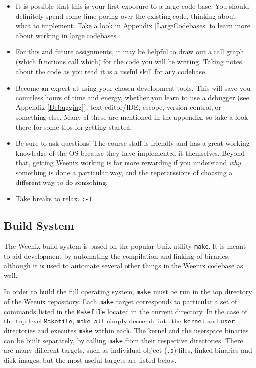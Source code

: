 \begin{itemize}
    \item It is possible that this is your first exposure to a large code base. You should definitely spend some time poring over the existing code, thinking about what to implement. Take a look in Appendix \ref{LargeCodebases} to learn more about working in large codebases.
    \item For this and future assignments, it may be helpful to draw out a call graph (which functions call which) for the code you will be writing. Taking notes about the code as you read it is a useful skill for any codebase.
    \item Become an expert at using your chosen development tools. This will save you countless hours of time and energy, whether you learn to use a debugger (see Appendix \ref{Debugging}), text editor/IDE, cscope, version control, or something else. Many of these are mentioned in the appendix, so take a look there for some tips for getting started.
    \item Be sure to ask questions! The course staff is friendly and has a great working knowledge of the OS because they have implemented it themselves. Beyond that, getting Weenix working is far more rewarding if you understand \emph{why} something is done a particular way, and the repercussions of choosing a different way to do something.
    \item Take breaks to relax. \texttt{:-)}
\end{itemize}

\subsection{Build System}
The Weenix build system is based on the popular Unix utility \texttt{make}. It is meant to aid development by automating the compilation and linking of binaries, although it is used to automate several other things in the Weenix codebase as well.

In order to build the full operating system, \texttt{make} must be run in the top directory of the Weenix repository. Each \texttt{make} target corresponds to particular a set of commands listed in the \texttt{Makefile} located in the current directory. In the case of the top-level \texttt{Makefile}, \texttt{make all} simply descends into the \texttt{kernel} and \texttt{user} directories and executes \texttt{make} within each. The kernel and the userspace binaries can be built separately, by calling \texttt{make} from their respective directories. There are many different targets, such as individual object (\texttt{.o}) files, linked binaries and disk images, but the most useful targets are listed below.
  
